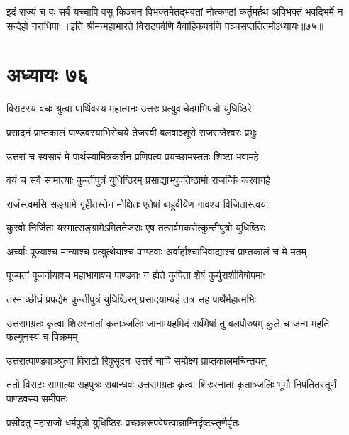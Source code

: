 \threelineshloka
{इदं राज्यं च वः सर्वं यच्चापि वसु किञ्चन}
{विभक्तमेतद्भवतां नोत्कण्ठां कर्तुमर्हथ}
{अविभक्तं भवद्भिर्मे न सन्देहो नराधिपाः}
॥इति श्रीमन्महाभारते विराटपर्वणि वैवाहिकपर्वणि पञ्चसप्ततितमोऽध्यायः॥७५॥

\chapter{अध्यायः ७६}

\twolineshloka
{विराटस्य वचः श्रुत्वा पार्थिवस्य महात्मनः}
{उत्तरः प्रत्युवाचेदमभिपन्नो युधिष्ठिरे}


\twolineshloka
{प्रसादनं प्राप्तकालं पाण्डवस्याभिरोचये}
{तेजस्वी बलवाञ्शूरो राजराजेश्वरः प्रभुः}


\twolineshloka
{उत्तरां च स्वसारं मे पार्थस्यामित्रकर्शन}
{प्रणिपत्य प्रयच्छामस्ततः शिष्टा भवामहे}



\twolineshloka
{वयं च सर्वे सामात्याः कुन्तीपुत्रं युधिष्ठिरम्}
{प्रसाद्याभ्युपतिष्ठामो राजन्किं करवागहे}


\twolineshloka
{राजंस्त्वमसि सङ्ग्रामे गृहीतस्तेन मोक्षितः}
{एतेषां बाहुवीर्येण गावश्च विजितास्त्वया}


\twolineshloka
{कुरवो निर्जिता यस्मात्सङ्ग्रामेऽमिततेजसः}
{एष तत्सर्वमकरोत्कुन्तीपुत्रो युधिष्ठिरः}


\twolineshloka
{अर्च्याः पूज्याश्च मान्याश्च प्रत्युत्थेयाश्च पाण्डवाः}
{अर्वार्हाश्चाभिवाद्याश्च प्राप्तकालं च मे मतम्}


\twolineshloka
{पूज्यतां पूजनीयाश्च महाभागाश्च पाण्डवाः}
{न ह्येते कुपिता शेषं कुर्युराशीविषोपमाः}


\twolineshloka
{तस्माच्छीघ्रं प्रपद्येम कुन्तीपुत्रं युधिष्ठिरम्}
{प्रसादयाम्यहं तत्र सह पार्थेर्महात्मभिः}


\threelineshloka
{उत्तरामग्रतः कृत्वा शिरःस्नातां कृताञ्जलिः}
{जानाम्यहमिदं सर्वमेषां तु बलपौरुषम्}
{कुले च जन्म महति फल्गुनस्य च विक्रमम्}




\twolineshloka
{उत्तरात्पाण्डवाञ्श्रुत्वा विराटो रिपुसूदनः}
{उत्तरं चापि सम्प्रेक्ष्य प्राप्तकालमचिन्तयत्}


\threelineshloka
{ततो विराटः सामात्यः सहपुत्रः सबान्धवः}
{उत्तरामग्रतः कृत्वा शिरःस्नातां कृताञ्जलिः}
{भूमौ निपतितस्तूर्णं पाण्डवस्य समीपतः}




\twolineshloka
{प्रसीदतु महाराजो धर्मपुत्रो युधिष्ठिरः}
{प्रच्छन्नरूपवेषत्वान्नाग्निर्दृष्टस्तृणैर्वृतः}


